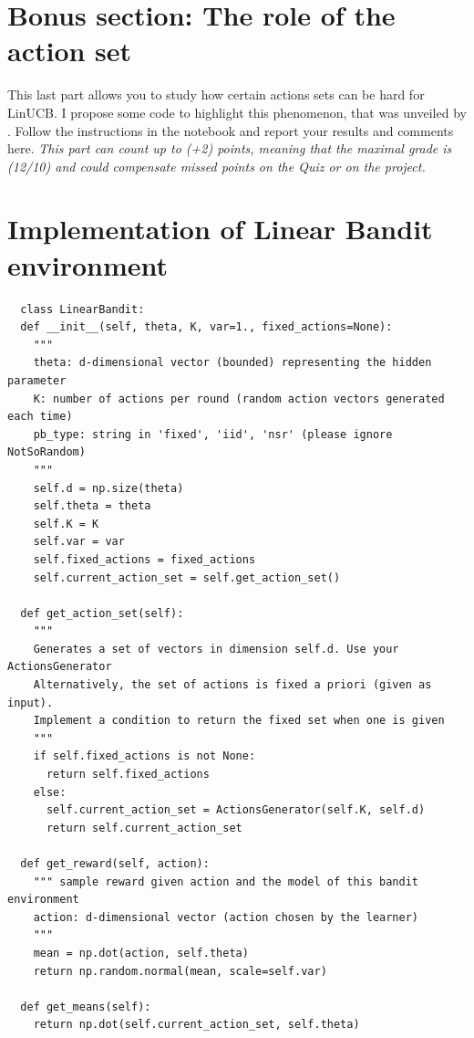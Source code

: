 

\newpage





\appendix

\section{Bonus section: The role of the action set}

This last part allows you to study how certain actions sets can be hard for LinUCB. I propose some code to highlight this phenomenon, that was unveiled by \citet{lattimore2017end}. 
Follow the instructions in the notebook and report your results and comments here. 
\emph{This part can count up to (+2) points, meaning that the maximal grade is (12/10) and could compensate missed points on the Quiz or on the project. }

\section{Implementation of \textbf{Linear Bandit} environment}
\begin{verbatim}
  class LinearBandit:
  def __init__(self, theta, K, var=1., fixed_actions=None):
    """
    theta: d-dimensional vector (bounded) representing the hidden parameter
    K: number of actions per round (random action vectors generated each time)
    pb_type: string in 'fixed', 'iid', 'nsr' (please ignore NotSoRandom)
    """
    self.d = np.size(theta)
    self.theta = theta
    self.K = K
    self.var = var
    self.fixed_actions = fixed_actions
    self.current_action_set = self.get_action_set()

  def get_action_set(self):
    """
    Generates a set of vectors in dimension self.d. Use your ActionsGenerator
    Alternatively, the set of actions is fixed a priori (given as input).
    Implement a condition to return the fixed set when one is given
    """
    if self.fixed_actions is not None:
      return self.fixed_actions
    else:
      self.current_action_set = ActionsGenerator(self.K, self.d)
      return self.current_action_set

  def get_reward(self, action):
    """ sample reward given action and the model of this bandit environment
    action: d-dimensional vector (action chosen by the learner)
    """
    mean = np.dot(action, self.theta)
    return np.random.normal(mean, scale=self.var)

  def get_means(self):
    return np.dot(self.current_action_set, self.theta)
\end{verbatim}


